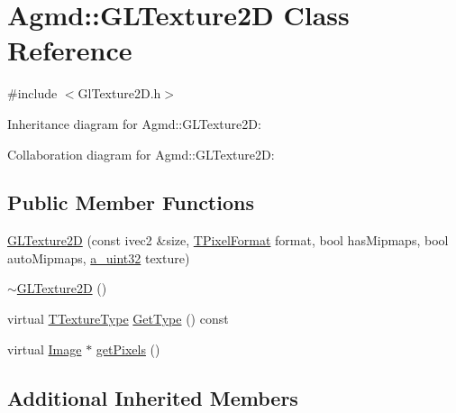 \hypertarget{class_agmd_1_1_g_l_texture2_d}{\section{Agmd\+:\+:G\+L\+Texture2\+D Class Reference}
\label{class_agmd_1_1_g_l_texture2_d}
}


{\ttfamily \#include $<$Gl\+Texture2\+D.\+h$>$}



Inheritance diagram for Agmd\+:\+:G\+L\+Texture2\+D\+:


Collaboration diagram for Agmd\+:\+:G\+L\+Texture2\+D\+:
\subsection*{Public Member Functions}
\begin{DoxyCompactItemize}
\item 
\hyperlink{class_agmd_1_1_g_l_texture2_d_af3f1e6cc445f997df0458e2ad5f800ee}{G\+L\+Texture2\+D} (const ivec2 \&size, \hyperlink{namespace_agmd_afc48fd9fa5dccb4c5621c052bfd1a7ec}{T\+Pixel\+Format} format, bool has\+Mipmaps, bool auto\+Mipmaps, \hyperlink{_common_defines_8h_a964296f9770051b9e4807b1f180dd416}{a\+\_\+uint32} texture)
\item 
\hyperlink{class_agmd_1_1_g_l_texture2_d_ae75b4b2563b012ce68fda2543471c33e}{$\sim$\+G\+L\+Texture2\+D} ()
\item 
virtual \hyperlink{namespace_agmd_a7036bece09449a930cfec410f75e85f4}{T\+Texture\+Type} \hyperlink{class_agmd_1_1_g_l_texture2_d_a67a15cc6c3a7d6bd4474f0bd0ff9685e}{Get\+Type} () const 
\item 
virtual \hyperlink{class_agmd_1_1_image}{Image} $\ast$ \hyperlink{class_agmd_1_1_g_l_texture2_d_a5a085ab09b63cbd3f2135728eb06a208}{get\+Pixels} ()
\end{DoxyCompactItemize}
\subsection*{Additional Inherited Members}


